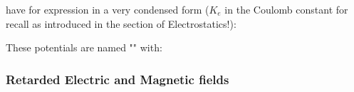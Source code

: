 	have for expression in a very condensed form ($K_e$ in the Coulomb constant for recall as introduced in the section of Electrostatics!):
	
	These potentials are named "" with:
	
	
	\subsubsection{Retarded Electric and Magnetic fields}
	
	
	
	
	
	
	
	
	
	
	
	
	
	
	
	
	
	
	
	
	
	
	
	
	
	
	
	
	
	
	
	
	
	
	
	
	
	
	
	
	
	
	
	
	
	
	
	
	
	
	
	
	
	
	
	
	
	
	
	
	
	
	
	
	
	
	
	
	
	
	
	
	
	
	
	
	
	
	
	
	
	
	
	
	
	
	
	
	
	
	
	
	
